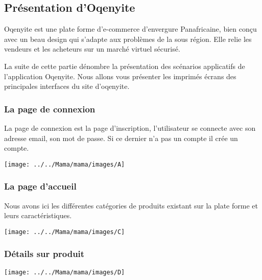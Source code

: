 \subsection{Présentation d'Oqenyite}

Oqenyite est une plate forme d'e-commerce d'envergure Panafricaine, bien conçu avec un beau design qui s'adapte aux problèmes de la sous région.
Elle relie les vendeurs et les acheteurs sur un marché virtuel sécurisé.


 La suite de cette partie dénombre la présentation des scénarios applicatifs de l'application Oqenyite. Nous allons vous présenter les imprimés écrans des principales interfaces du site d'oqenyite.





\subsubsection*{La page de connexion}
La page de connexion est la page d'inscription, l'utilisateur se connecte avec son adresse email, son mot de passe. Si ce dernier n'a pas un compte il crée un compte.

\begin{minipage}[c]{0,45\textwidth}
	\begin{center}
	\texttt{[image: ../../Mama/mama/images/A]}
   \end{center}
\end{minipage}


\subsubsection*{La page d'accueil}

Nous avons ici les différentes catégories de produits existant sur la plate forme et leurs  caractéristiques.
 
\begin{minipage}[c]{0,45\textwidth}
	\begin{center}
	\texttt{[image: ../../Mama/mama/images/C]}
\end{center}
\end{minipage}

\subsubsection*{Détails sur produit}
\begin{minipage}[c]{.45\textwidth}
	\begin{center}
	\texttt{[image: ../../Mama/mama/images/D]}
\end{center}
\end{minipage}

